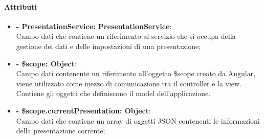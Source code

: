 	\paragraph{Attributi}
	\begin{itemize}
		\item \textbf{- PresentationService: PresentationService}:\\
			Campo dati che contiene un riferimento al servizio che si occupa della gestione dei dati e delle impostazioni di una presentazione;
		\item \textbf{- \$scope: Object}:\\
			Campo dati contenente un riferimento all'oggetto \$scope creato da Angular, viene utilizzato come mezzo di comunicazione tra il controller e la view. Contiene gli oggetti che definiscono il model dell'applicazione.
		\item \textbf{- \$scope.currentPresentation: Object}:\\
			Campo dati che contiene un array di oggetti JSON contenenti le informazioni della presentazione corrente;		
		
	\end{itemize}
	
